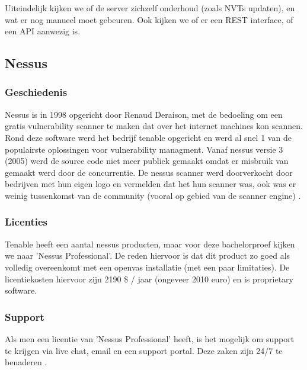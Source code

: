 Uiteindelijk kijken we of  de server zichzelf onderhoud (zoals NVTs updaten), en wat er nog manueel moet gebeuren. Ook kijken we of er een REST interface, of een API aanwezig is. 

\subsection{Nessus}


\subsubsection{Geschiedenis}
Nessus is in 1998 opgericht door Renaud Deraison, met de bedoeling om een gratis vulnerability scanner te maken dat over het internet machines kon scannen. Rond deze software werd het bedrijf tenable opgericht en werd al snel 1 van de populairste oplossingen voor vulnerability managment. Vanaf nessus versie 3 (2005) werd de source code niet meer publiek gemaakt omdat er misbruik van gemaakt werd door de concurrentie. De nessus scanner werd doorverkocht door bedrijven met hun eigen logo en vermelden dat het hun scanner was, ook was er weinig tussenkomst van de community (vooral op gebied van de scanner engine) \textcite{Cnet}.

\subsubsection{Licenties}
Tenable heeft een aantal nessus producten, maar voor deze bachelorproef kijken we naar 'Nessus Professional'. De reden hiervoor is dat dit product zo goed als volledig overeenkomt met een openvas installatie (met een paar limitaties). De licentiekosten hiervoor zijn 2190 \$ / jaar (ongeveer 2010 euro) en is proprietary software.
 
\subsubsection{Support}
Als men een licentie van 'Nessus Professional' heeft, is het mogelijk om support te krijgen via live chat, email en een support portal. Deze zaken zijn 24/7 te benaderen \textcite{Nessus-support}.
 
